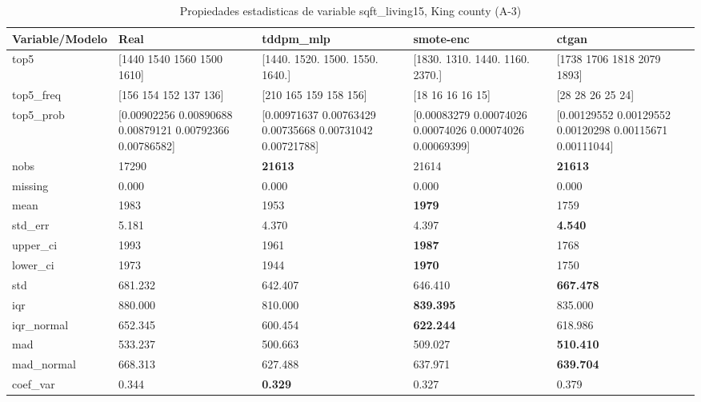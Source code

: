 \begin{table}[H]
\centering
\fontsize{8}{14}\selectfont
\caption{Propiedades  estadisticas de variable sqft\_living15, King county (A-3)}
\label{table-stats-king county-a-3-sqft_living15}
\begin{tabular}{|l|m{10em}|m{10em}|m{10em}|m{10em}|}
\hline
 \rowcolor[gray]{0.8}
Variable/Modelo & Real & tddpm\_mlp & smote-enc & ctgan \\
\hline top5 & [1440 1540 1560 1500 1610] & [1440. 1520. 1500. 1550. 1640.] & [1830. 1310. 1440. 1160. 2370.] & [1738 1706 1818 2079 1893] \\
\hline top5\_freq & [156 154 152 137 136] & [210 165 159 158 156] & [18 16 16 16 15] & [28 28 26 25 24] \\
\hline top5\_prob & [0.00902256 0.00890688 0.00879121 0.00792366 0.00786582] & [0.00971637 0.00763429 0.00735668 0.00731042 0.00721788] & [0.00083279 0.00074026 0.00074026 0.00074026 0.00069399] & [0.00129552 0.00129552 0.00120298 0.00115671 0.00111044] \\
\hline nobs & 17290 & \bfseries 21613 & \cellcolor[rgb]{0.9, 0.54, 0.52} 21614 & \bfseries 21613 \\
\hline missing & 0.000 & 0.000 & 0.000 & 0.000 \\
\hline mean & 1983 & 1953 & \bfseries 1979 & \cellcolor[rgb]{0.9, 0.54, 0.52} 1759 \\
\hline std\_err & 5.181 & \cellcolor[rgb]{0.9, 0.54, 0.52} 4.370 & 4.397 & \bfseries 4.540 \\
\hline upper\_ci & 1993 & 1961 & \bfseries 1987 & \cellcolor[rgb]{0.9, 0.54, 0.52} 1768 \\
\hline lower\_ci & 1973 & 1944 & \bfseries 1970 & \cellcolor[rgb]{0.9, 0.54, 0.52} 1750 \\
\hline std & 681.232 & \cellcolor[rgb]{0.9, 0.54, 0.52} 642.407 & 646.410 & \bfseries 667.478 \\
\hline iqr & 880.000 & \cellcolor[rgb]{0.9, 0.54, 0.52} 810.000 & \bfseries 839.395 & 835.000 \\
\hline iqr\_normal & 652.345 & \cellcolor[rgb]{0.9, 0.54, 0.52} 600.454 & \bfseries 622.244 & 618.986 \\
\hline mad & 533.237 & \cellcolor[rgb]{0.9, 0.54, 0.52} 500.663 & 509.027 & \bfseries 510.410 \\
\hline mad\_normal & 668.313 & \cellcolor[rgb]{0.9, 0.54, 0.52} 627.488 & 637.971 & \bfseries 639.704 \\
\hline coef\_var & 0.344 & \bfseries 0.329 & 0.327 & \cellcolor[rgb]{0.9, 0.54, 0.52} 0.379 \\

\end{tabular}
\end{table}
